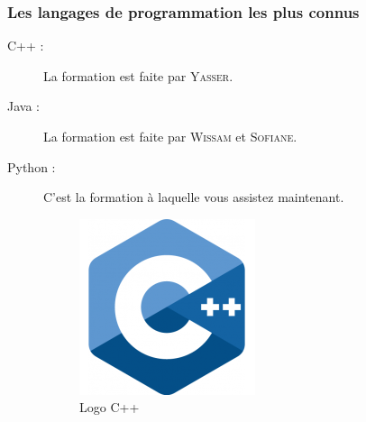 \documentclass[12pt]{article}
\begin{document}
        \subsubsection{Les langages de programmation les plus connus}
            \begin{description}
                \item[C++ :] La formation est faite par \textsc{Yasser}.
                \item[Java :] La formation est faite par \textsc{Wissam} et \textsc{Sofiane}.
                \item[Python :] C'est la formation à laquelle vous assistez maintenant.
            \end{description}

        \begin{figure}[H]
            \centering
            \begin{subfigure}[b]{0.32\textwidth}
                \centering
                \includegraphics[width=\textwidth]{img/5_c++.png}
                \caption{Logo C++}
            \end{subfigure}
            \hfill
            \begin{subfigure}[b]{0.32\textwidth}
                \centering

\end{subfigure}
\end{figure}
\end{document}
